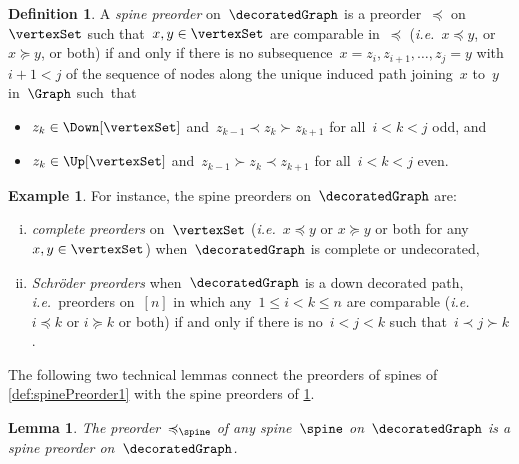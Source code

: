 \documentclass{amsart}
\newtheorem{lemma}[theorem]{Lemma}
\theoremstyle{definition}
\newtheorem{definition}[theorem]{Definition}
\newtheorem{example}[theorem]{Example}
\newcommand{\ie}{\textit{i.e.}~} %
\newcommand{\darkblue}{\color{darkblue}} %
\newcommand{\defn}[1]{\textsl{\darkblue #1}} %
\begin{document}
\begin{definition}
  \label{def:spinePreorder2}
  A \defn{spine preorder} on~$\decoratedGraph$ is a preorder~$\preccurlyeq$ on~$\vertexSet$ such that~$x,y \in \vertexSet$ are comparable in~$\preccurlyeq$ (\ie $x \preccurlyeq y$, or~$x \succcurlyeq y$, or both) if and only if there is no subsequence~$x = z_i, z_{i+1}, \dots, z_j = y$ with~$i + 1 < j$ of the sequence of nodes along the unique induced path joining~$x$ to~$y$ in~$\Graph$ such~that
  \begin{itemize}
    \item $z_k \in \Down[\vertexSet]$ and~$z_{k-1} \prec z_k \succ z_{k+1}$ for all~$i < k < j$ odd, and
    \item $z_k \in \Up[\vertexSet]$ and~$z_{k-1} \succ z_k \prec z_{k+1}$ for all~$i < k < j$ even.
  \end{itemize}
\end{definition}

\begin{example}
  \label{exm:spinePreorder}
  For instance, the spine preorders on~$\decoratedGraph$ are:
  \begin{enumerate}[(i)]
    \item \defn{complete preorders} on~$\vertexSet$ (\ie $x \preccurlyeq y$ or $x \succcurlyeq y$ or both for any~$x,y \in \vertexSet$) when~$\decoratedGraph$ is complete or undecorated,
    \item \defn{Schr\"oder preorders} when~$\decoratedGraph$ is a down decorated path, \ie preorders on~$[n]$ in which any~$1 \le i < k \le n$ are comparable (\ie~$i \preccurlyeq k$ or $i \succcurlyeq k$ or both) if and only if there is no~$i < j < k$ such that~$i \prec j \succ k$.
  \end{enumerate}
\end{example}

The following two technical lemmas connect the preorders of spines of \cref{def:spinePreorder1} with the spine preorders of \cref{def:spinePreorder2}.

\begin{lemma}
  \label{lem:spinePreorder1}
  The preorder~$\preccurlyeq_{\spine}$ of any spine~$\spine$ on~$\decoratedGraph$ is a spine preorder on~$\decoratedGraph$.
\end{lemma}
\end{document}
